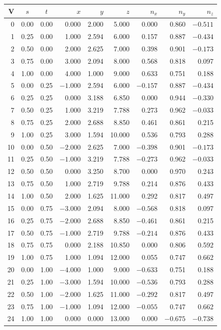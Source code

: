 \documentclass[11pt,a4paper]{article}
\begin{document}
\begin{center}
\small
\begin{longtable}{r cc rrr rrr}
\toprule
\textbf{V} & $s$ & $t$ & $x$ & $y$ & $z$ & $n_x$ & $n_y$ & $n_z$ \\
\midrule
\endhead
 0 & 0.00 & 0.00 &  0.000 &  2.000 &  5.000 &  0.000 &  0.860 & $-0.511$ \\
 1 & 0.25 & 0.00 &  1.000 &  2.594 &  6.000 &  0.157 &  0.887 & $-0.434$ \\
 2 & 0.50 & 0.00 &  2.000 &  2.625 &  7.000 &  0.398 &  0.901 & $-0.173$ \\
 3 & 0.75 & 0.00 &  3.000 &  2.094 &  8.000 &  0.568 &  0.818 &  0.097 \\
 4 & 1.00 & 0.00 &  4.000 &  1.000 &  9.000 &  0.633 &  0.751 &  0.188 \\
\midrule
 5 & 0.00 & 0.25 & $-1.000$ &  2.594 &  6.000 & $-0.157$ &  0.887 & $-0.434$ \\
 6 & 0.25 & 0.25 &  0.000 &  3.188 &  6.850 &  0.000 &  0.944 & $-0.330$ \\
 7 & 0.50 & 0.25 &  1.000 &  3.219 &  7.788 &  0.273 &  0.962 & $-0.033$ \\
 8 & 0.75 & 0.25 &  2.000 &  2.688 &  8.850 &  0.461 &  0.861 &  0.215 \\
 9 & 1.00 & 0.25 &  3.000 &  1.594 & 10.000 &  0.536 &  0.793 &  0.288 \\
\midrule
10 & 0.00 & 0.50 & $-2.000$ &  2.625 &  7.000 & $-0.398$ &  0.901 & $-0.173$ \\
11 & 0.25 & 0.50 & $-1.000$ &  3.219 &  7.788 & $-0.273$ &  0.962 & $-0.033$ \\
12 & 0.50 & 0.50 &  0.000 &  3.250 &  8.700 &  0.000 &  0.970 &  0.243 \\
13 & 0.75 & 0.50 &  1.000 &  2.719 &  9.788 &  0.214 &  0.876 &  0.433 \\
14 & 1.00 & 0.50 &  2.000 &  1.625 & 11.000 &  0.292 &  0.817 &  0.497 \\
\midrule
15 & 0.00 & 0.75 & $-3.000$ &  2.094 &  8.000 & $-0.568$ &  0.818 &  0.097 \\
16 & 0.25 & 0.75 & $-2.000$ &  2.688 &  8.850 & $-0.461$ &  0.861 &  0.215 \\
17 & 0.50 & 0.75 & $-1.000$ &  2.719 &  9.788 & $-0.214$ &  0.876 &  0.433 \\
18 & 0.75 & 0.75 &  0.000 &  2.188 & 10.850 &  0.000 &  0.806 &  0.592 \\
19 & 1.00 & 0.75 &  1.000 &  1.094 & 12.000 &  0.055 &  0.747 &  0.662 \\
\midrule
20 & 0.00 & 1.00 & $-4.000$ &  1.000 &  9.000 & $-0.633$ &  0.751 &  0.188 \\
21 & 0.25 & 1.00 & $-3.000$ &  1.594 & 10.000 & $-0.536$ &  0.793 &  0.288 \\
22 & 0.50 & 1.00 & $-2.000$ &  1.625 & 11.000 & $-0.292$ &  0.817 &  0.497 \\
23 & 0.75 & 1.00 & $-1.000$ &  1.094 & 12.000 & $-0.055$ &  0.747 &  0.662 \\
24 & 1.00 & 1.00 &  0.000 &  0.000 & 13.000 &  0.000 & $-0.675$ & $-0.738$ \\
\bottomrule
\end{longtable}
\end{center}
\end{document}
